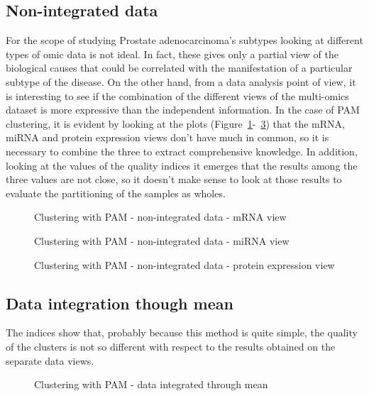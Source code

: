 \subsection{Non-integrated data}\label{pam_nonIntegrated}
For the scope of studying Prostate adenocarcinoma's subtypes looking at different types of omic data is not ideal. In fact, these gives only a partial view of the biological causes that could be correlated with the manifestation of a particular subtype of the disease. On the other hand, from a data analysis point of view, it is interesting to see if the combination of the different views of the multi-omics dataset is more expressive than the independent information. In the case of PAM clustering, it is evident by looking at the plots (Figure~\ref{fig:pam_1}-~\ref{fig:pam_3}) that the mRNA, miRNA and protein expression views don't have much in common, so it is necessary to combine the three to extract comprehensive knowledge. In addition, looking at the values of the quality indices it emerges that the results among the three values are not close, so it doesn't make sense to look at those results to evaluate the partitioning of the samples as wholes.
\begin{figure}\label{fig:pam_1}
    \centering
    \caption{Clustering with PAM - non-integrated data - mRNA view}
\end{figure}
\begin{figure}\label{fig:pam_2}
    \centering
    \caption{Clustering with PAM - non-integrated data - miRNA view}
\end{figure}
\begin{figure}\label{fig:pam_3}
    \centering
    \caption{Clustering with PAM - non-integrated data - protein expression view}
\end{figure}

\subsection{Data integration though mean}\label{pam_mean}
The indices show that, probably because this method is quite simple, the quality of the clusters is not so different with respect to the results obtained on the separate data views.
\begin{figure}\label{fig:pam_mean}
    \centering
    \caption{Clustering with PAM - data integrated through mean}
\end{figure}


